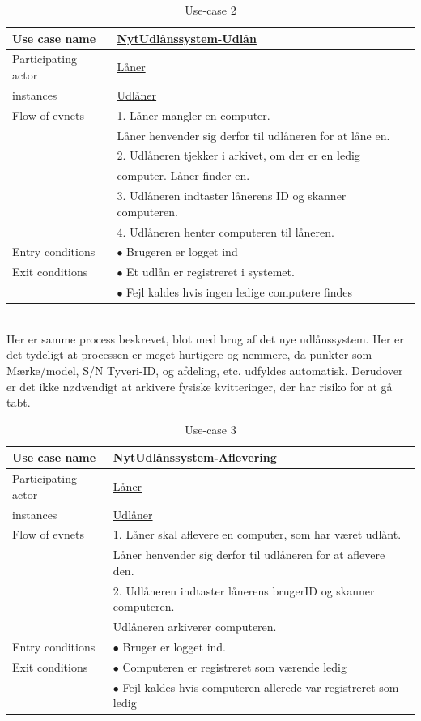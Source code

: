 \documentclass[a4paper]{article}
\begin{document}
\begin{table}[h]
\caption{Use-case 2}
\begin{tabular}{ll}
Use case name             & \underline{NytUdlånssystem-Udlån} \\ \hline
Participating actor           & \underline{Låner} \\
instances                     & \underline{Udlåner}\\ \hline
Flow of evnets                & 1. Låner mangler en computer.	\\& Låner henvender sig derfor til udlåneren for at låne en.
\\& 2. Udlåneren tjekker i arkivet, om der er en ledig \\& computer. Låner finder en.
\\& 3. Udlåneren indtaster lånerens ID og skanner computeren.
\\& 4. Udlåneren henter computeren til låneren.\\ \hline
Entry conditions & $\bullet$ Brugeren er logget ind \\ \hline
Exit conditions  & $\bullet$ Et udlån er registreret i systemet.\\
& $\bullet$ Fejl kaldes hvis ingen ledige computere findes
\end{tabular}
\end{table}\\
Her er samme process beskrevet, blot med brug af det nye udlånssystem. Her er det tydeligt at processen er meget hurtigere og nemmere, da punkter som Mærke/model, S/N Tyveri-ID, og afdeling, etc. udfyldes automatisk. Derudover er det ikke nødvendigt at arkivere fysiske kvitteringer, der har risiko for at gå tabt.
\newpage
\begin{table}[h]
\caption{Use-case 3}
\begin{tabular}{ll}
Use case name               & \underline{NytUdlånssystem-Aflevering} \\ \hline
Participating actor           & \underline{Låner} \\
instances                     & \underline{Udlåner}\\ \hline
Flow of evnets                & 1. Låner skal aflevere en computer, som har været udlånt.
\\& Låner henvender sig derfor til udlåneren for at aflevere den.
\\& 2. Udlåneren indtaster lånerens brugerID og skanner computeren.
\\& Udlåneren arkiverer computeren. \\ \hline
Entry conditions & $\bullet$ Bruger er logget ind.\\ \hline
Exit conditions  & $\bullet$ Computeren er registreret som værende ledig\\
& $\bullet$ Fejl kaldes hvis computeren allerede var registreret som ledig
\end{tabular}
\end{table}
\end{document}
